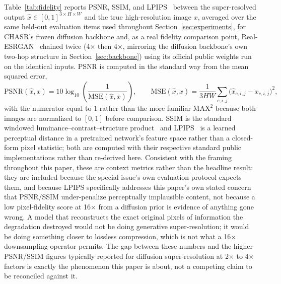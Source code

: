 \documentclass[review]{elsarticle}
\begin{document}
Table~\ref{tab:fidelity} reports PSNR, SSIM, and LPIPS~\citep{zhang2018lpips} between the super-resolved output $\hat{x} \in [0,1]^{3\times H\times W}$ and the true high-resolution image $x$, averaged over the same held-out evaluation items used throughout Section~\ref{sec:experiments}, for CHASR's frozen diffusion backbone and, as a real fidelity comparison point, Real-ESRGAN~\citep{wang2021realesrgan} chained twice (4$\times$ then 4$\times$, mirroring the diffusion backbone's own two-hop structure in Section~\ref{sec:backbone}) using its official public \texttt{} weights run on the identical inputs. PSNR is computed in the standard way from the mean squared error,
\begin{equation}
\mathrm{PSNR}(\hat{x}, x) = 10 \log_{10}\!\left(\frac{1}{\mathrm{MSE}(\hat{x},x)}\right), \qquad \mathrm{MSE}(\hat{x},x) = \frac{1}{3HW}\sum_{c,i,j}\big(\hat{x}_{c,i,j} - x_{c,i,j}\big)^2,
\label{eq:psnr}
\end{equation}
with the numerator equal to $1$ rather than the more familiar $\mathrm{MAX}^2$ because both images are normalized to $[0,1]$ before comparison. SSIM is the standard windowed luminance--contrast--structure product~\citep{wang2004ssim} and LPIPS~\citep{zhang2018lpips} is a learned perceptual distance in a pretrained network's feature space rather than a closed-form pixel statistic; both are computed with their respective standard public implementations rather than re-derived here. Consistent with the framing throughout this paper, these are context metrics rather than the headline result: they are included because the special issue's own evaluation protocol expects them, and because LPIPS specifically addresses this paper's own stated concern that PSNR/SSIM under-penalize perceptually implausible content, not because a low pixel-fidelity score at 16$\times$ from a diffusion prior is evidence of anything gone wrong. A model that reconstructs the exact original pixels of information the degradation destroyed would not be doing generative super-resolution; it would be doing something closer to lossless compression, which is not what a 16$\times$ downsampling operator permits. The gap between these numbers and the higher PSNR/SSIM figures typically reported for diffusion super-resolution at 2$\times$ to 4$\times$ factors is exactly the phenomenon this paper is about, not a competing claim to be reconciled against it.
\end{document}
